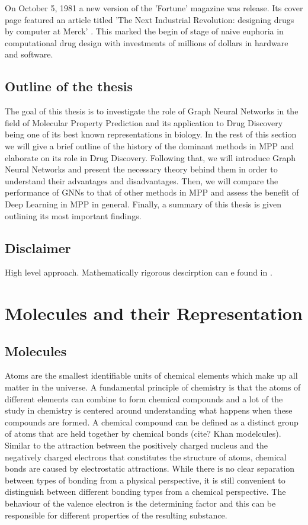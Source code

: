 On October 5, 1981 a new version of the 'Fortune' magazine was release. Its cover page featured an article titled 'The   Next Industrial  Revolution:  designing  drugs  by  computer  at Merck' \cite{article}. This marked the begin of stage of naive euphoria in computational drug design with investments of millions of dollars in hardware and software. 
\subsection{Outline of the thesis}
The goal of this thesis is to investigate the role of Graph Neural Networks in the field of Molecular Property Prediction and its application to Drug Discovery being one of its best known representations in biology. In the rest of this section we will give a brief outline of the history of the dominant methods in MPP and elaborate on its role in Drug Discovery. Following that, we will introduce Graph Neural Networks and present the necessary theory behind them in order to understand their advantages and disadvantages. Then, we will compare the performance of GNNs to that of other methods in MPP and assess the benefit of Deep Learning in MPP in general. Finally, a summary of this thesis is given outlining its most important findings. 
\subsection{Disclaimer}
High level approach. Mathematically rigorous descirption can e found in \cite{KerberAdalbert2014Mcac}.
\section{Molecules and their Representation}



\subsection{Molecules}
Atoms are the smallest identifiable units of chemical elements which make up all matter in the universe. A fundamental principle of chemistry is that the atoms of different elements can combine to form chemical compounds and a lot of the study in chemistry is centered around understanding what happens when these compounds are formed. A chemical compound can be defined as a distinct group of atoms that are held together by chemical bonds (cite? Khan modelcules). Similar to the attraction between the positively charged nucleus and the negatively charged electrons that constitutes the structure of atoms, chemical bonds are caused by electrostatic attractions. While there is no clear separation between types of bonding from a physical perspective, it is still convenient to distinguish between different bonding types from a chemical perspective. The behaviour of the valence electron is the determining factor and this can be responsible for different properties of the resulting substance.

